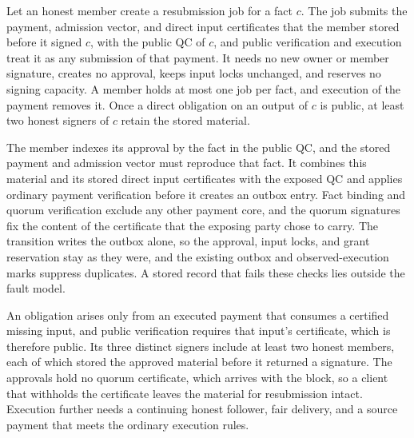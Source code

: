 \begin{lemma}
\label{lem:security-resubmission}
Let an honest member create a resubmission job for a fact $c$. The job submits the payment, admission vector, and direct input certificates that the member stored before it signed $c$, with the public QC of $c$, and public verification and execution treat it as any submission of that payment. It needs no new owner or member signature, creates no approval, keeps input locks unchanged, and reserves no signing capacity. A member holds at most one job per fact, and execution of the payment removes it. Once a direct obligation on an output of $c$ is public, at least two honest signers of $c$ retain the stored material.
\end{lemma}
\begin{IEEEproof}
The member indexes its approval by the fact in the public QC, and the stored payment and admission vector must reproduce that fact. It combines this material and its stored direct input certificates with the exposed QC and applies ordinary payment verification before it creates an outbox entry. Fact binding and quorum verification exclude any other payment core, and the quorum signatures fix the content of the certificate that the exposing party chose to carry. The transition writes the outbox alone, so the approval, input locks, and grant reservation stay as they were, and the existing outbox and observed-execution marks suppress duplicates. A stored record that fails these checks lies outside the fault model.

An obligation arises only from an executed payment that consumes a certified missing input, and public verification requires that input's certificate, which is therefore public. Its three distinct signers include at least two honest members, each of which stored the approved material before it returned a signature. The approvals hold no quorum certificate, which arrives with the block, so a client that withholds the certificate leaves the material for resubmission intact. Execution further needs a continuing honest follower, fair delivery, and a source payment that meets the ordinary execution rules.
\end{IEEEproof}

